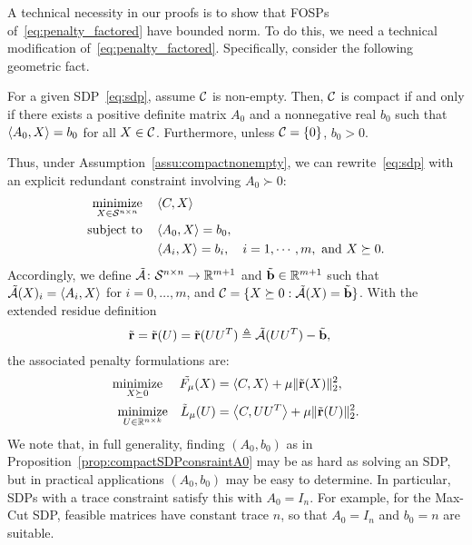 A technical necessity in our proofs is to show that FOSPs of~\eqref{eq:penalty_factored} have bounded norm. To do this, we need a technical modification of~\eqref{eq:penalty_factored}. Specifically, consider the following geometric fact.
\begin{proposition}\label{prop:compactSDPconsraintA0}
	For a given SDP~\eqref{eq:sdp}, assume $\mathcal{C}$ is non-empty. Then, $\mathcal{C}$ is compact if and only if there exists a positive definite matrix $A_0$ and a nonnegative real $b_0$ such that $\left\langle A_0, X \right\rangle = b_0$ for all $X \in \mathcal{C}$. Furthermore, unless $\mathcal{C} = \{0\}$, $b_0 > 0$.
\end{proposition}
Thus, under Assumption~\ref{assu:compactnonempty}, we can rewrite~\eqref{eq:sdp} with an explicit redundant constraint involving $A_0 \succ 0$:
\begin{align}
	\underset{X \in \mathcal{S}^{n\times n}}{\operatorname*{\mathrm{minimize}}} \quad & \left\langle C, X \right\rangle \nonumber \\
	\text{subject to} \quad & \left\langle A_0, X \right\rangle = b_0, \nonumber\\
							& \left\langle A_i, X \right\rangle = b_i,\quad i = 1,\cdots, m, \textrm{ and } X \succeq 0.
	\label{eq:sdpcompact}
\end{align}
Accordingly, we define $\tilde {\mathcal{A}} \colon \mathcal{S}^{n\times n} \to \mathbb{R}^{m+1}$ and $\tilde {\mathbf{b}} \in \mathbb{R}^{m+1}$ such that $\tilde {\mathcal{A}}(X)_i = \left\langle A_i, X \right\rangle$ for $i = 0, \ldots, m$, and $\mathcal{C} = \{ X \succeq 0 : \tilde {\mathcal{A}}(X) = \tilde {\mathbf{b}} \}$. With the extended residue definition
\begin{align}
	\tilde{\mathbf{r}} & = \tilde{\mathbf{r}}(U) = \tilde{\mathbf{r}}(UU^T) \triangleq \tilde {\mathcal{A}}(UU^T) - \tilde {\mathbf{b}},
\end{align}
the associated penalty formulations are:
\begin{align}
	\underset{X \succeq 0}{\operatorname*{\mathrm{minimize}}} ~\quad \tilde{F_{\mu}}(X) & =  \left\langle C, X \right\rangle + \mu \|\tilde {\mathbf{r}}(X)\|_2^2, \label{eq:penalty_sdp_compact} \\
	\underset{U \in \mathbb{R}^{n\times k}}{\operatorname*{\mathrm{minimize}}} \quad  \tilde L_{\mu}(U) & =  \left\langle C, UU^T \right\rangle + \mu \|\tilde {\mathbf{r}}(U)\|_2^2. \label{eq:penalty_factored_compact}
\end{align}
We note that, in full generality, finding $(A_0, b_0)$ as in Proposition~\ref{prop:compactSDPconsraintA0} may be as hard as solving an SDP, but in practical applications $(A_0, b_0)$ may be easy to determine. In particular, SDPs with a trace constraint satisfy this with $A_0=I_n$. For example, for the Max-Cut SDP,  feasible matrices have constant trace $n$, so that $A_0 = I_n$ and $b_0 = n$ are suitable.

